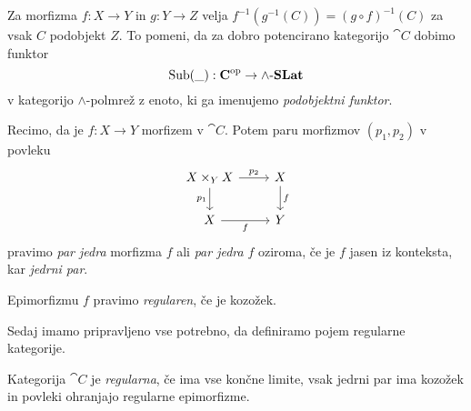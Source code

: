 \documentclass[../kategoricna_logika.tex]{subfiles}
\begin{document}
Za morfizma $f : X \to Y$ in $g : Y \to Z$ velja $f^{-1}(g^{-1}(C)) = (g \circ f)^{-1}(C)$
za vsak $C$ podobjekt $Z$.
To pomeni, da za dobro potencirano kategorijo $\cat{C}$ dobimo funktor
$$\operatorname{Sub}(\_) : {\operatorname{\mathbf{C}}}^{\mathrm{op}} \to {\operatorname{\mathbf{\wedge-\mathbf{SLat}}}}$$
v kategorijo $\land$-polmrež z enoto, ki ga imenujemo \emph{podobjektni
  funktor}.
\begin{definicija}
  Recimo, da je $f : X \to Y$ morfizem v $\cat{C}$. Potem paru
  morfizmov $(p_1, p_2)$ v povleku
  \begin{equation*}
    \begin{tikzcd}
      X \times_Y X \ar[d, "p_1"'] \ar[r, "p_2"] & X \ar[d, "f"] \\
      X \ar[r, "f"'] & Y
    \end{tikzcd}
  \end{equation*}
  pravimo \emph{par jedra} morfizma $f$ ali \emph{par jedra} $f$
  oziroma, če je $f$ jasen iz konteksta, kar \emph{jedrni par}.
\end{definicija}
\begin{definicija}
  Epimorfizmu $f$ pravimo \emph{regularen}, če je kozožek.
\end{definicija}
Sedaj imamo pripravljeno vse potrebno, da definiramo pojem regularne
kategorije.
\begin{definicija}
  Kategorija $\cat{C}$ je \emph{regularna}, če ima vse končne limite,
  vsak jedrni par ima kozožek in povleki ohranjajo
  regularne epimorfizme.
\end{definicija}
\end{document}
